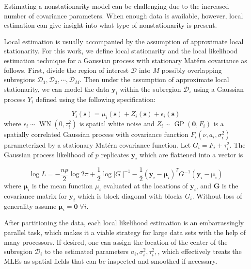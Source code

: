 \documentclass[review]{elsarticle}
\begin{document}
Estimating a nonstationarity model can be challenging due to the increased number of covariance parameters. When enough data is available, however, local estimation can give insight into what type of nonstationarity is present.

Local estimation is usually accompanied by the assumption of approximate local stationarity. For this work, we define local stationarity and the local likelihood estimation technique for a Gaussian process with stationary Mat\'ern covariance as follows. First, divide the region of interest $\mathcal{D}$ into $M$ possibly overlapping subregions $\mathcal{D}_1, \mathcal{D}_2, \cdots, \mathcal{D}_M$. Then under the assumption of approximate local stationarity, we can model the data $\mathbf y_i$ within the subregion $\mathcal{D}_i$ using a Gaussian process $Y_i$ defined using the following specification:

\begin{equation}
\label{e:4}
Y_i(\mathbf s) = \mu_i(\mathbf s) + Z_i (\mathbf s) + \epsilon_i (\mathbf s)    
\end{equation}
where $\epsilon_i \sim \operatorname{WN}(0, \tau_i^2)$ is spatial white noise and $Z_i \sim \operatorname{GP}( \mathbf 0, F_i)$ is a spatially correlated Gaussian process with covariance function $F_i(\nu, a_i, \sigma_i^2)$ parameterized by a stationary Mat\'ern covariance function. Let $G_i = F_i + \tau_i^2$. The Gaussian process likelihood of $p$ replicates $\mathbf y_i$ which are flattened into a vector is

\begin{equation}
\label{e:5}
     \log L = - \frac{n p}{2} \log 2 \pi + \frac{1}{2} \log | G \ |^{-1} - \frac{1}{2}(\mathbf y_i - \boldsymbol \mu_i )^T G^{-1} (\mathbf y_i - \boldsymbol \mu_i)
\end{equation}
where $\boldsymbol{\mu}_i$ is the mean function $\mu_i$ evaluated at the locations of $\mathbf y_i$, and $\mathbf G$ is the covariance matrix for $\mathbf y_i$ which is block diagonal with blocks $G_i$. Without loss of generality assume $\boldsymbol \mu _i = \mathbf 0 \; \forall i$.

After partitioning the data, each local likelihood estimation is an embarrassingly parallel task, which makes it a viable strategy for large data sets with the help of many processors. If desired, one can assign the location of the center of the subregion $\mathcal{D}_i$ to the estimated parameters $a_i, \sigma_i^2, \tau_i^2,$, which effectively treats the MLEs as spatial fields that can be inspected and smoothed if necessary.
\end{document}
